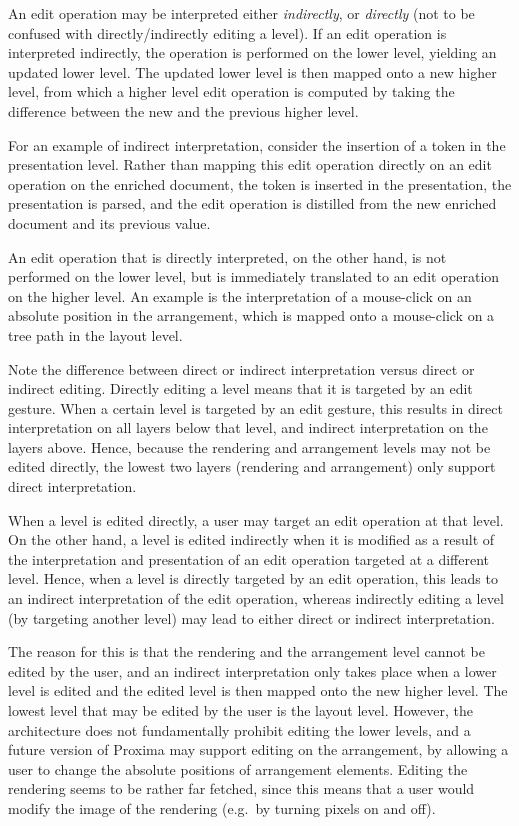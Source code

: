 An edit operation may be interpreted either {\em indirectly}, or {\em directly} (not to be confused with directly/indirectly editing a level). If an edit operation is interpreted indirectly, the operation is performed on the lower level, yielding an updated lower level. The updated lower level is then mapped onto a new higher level, from which a higher level edit operation is computed by taking the difference between the new and the previous higher level.

For an example of indirect interpretation, consider the insertion of a token in the presentation level. 
Rather than mapping this edit operation directly on an edit operation on the enriched document, the token is inserted in the presentation, the presentation is parsed, and the edit operation is distilled from the new enriched document and its previous value.

An edit operation that is directly interpreted, on the other hand, is not performed on the lower level, but is immediately translated to an edit operation on the higher level. An example is the interpretation of a mouse-click on an absolute position in the arrangement, which is mapped onto a mouse-click on a tree path in the layout level. 

Note the difference between direct or indirect interpretation versus direct or indirect editing. Directly editing a level means that it is targeted by an edit gesture. When a certain level is targeted by an edit gesture, this results in direct interpretation on all layers below that level, and indirect interpretation on the layers above. Hence, because the rendering and arrangement levels may not be edited directly, the lowest two layers (rendering and arrangement) only support direct interpretation.

\bc When a level is edited directly, a user may target an edit operation at that level. On the other hand, a level is edited indirectly when it is modified as a result of the interpretation and presentation of  an edit operation targeted at a different level. Hence, when a level is directly targeted by an edit operation, this leads to an indirect interpretation of the edit operation, whereas indirectly editing a level (by targeting another level) may lead to either direct or indirect interpretation. \ec



\bc The reason for this is that the rendering and the arrangement level cannot be edited by the user, and an indirect interpretation only takes place when a lower level is edited and the edited level is then mapped onto the new higher level. The lowest level that may be edited by the user is the layout level. However, the architecture does not fundamentally prohibit editing the lower levels, and a future version of Proxima may support editing on the arrangement, by allowing a user to change the absolute positions of arrangement elements. Editing the rendering seems to be rather far fetched, since this means that a user would modify the image of the rendering (e.g.\ by turning pixels on and off).
\ec



